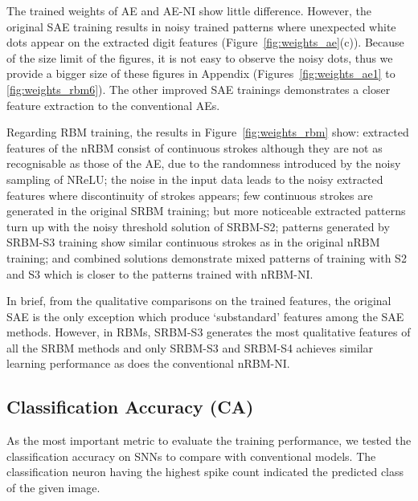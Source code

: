 The trained weights of AE and AE-NI show little difference.
However, the original SAE training results in noisy trained patterns where unexpected white dots appear on the extracted digit features (Figure~\ref{fig:weights_ae}(c)).
Because of the size limit of the figures, it is not easy to observe the noisy dots, thus we provide a bigger size of these figures in Appendix (Figures~\ref{fig:weights_ae1} to \ref{fig:weights_rbm6}).
The other improved SAE trainings demonstrates a closer feature extraction to the conventional AEs.



Regarding RBM training,
the results in Figure~\ref{fig:weights_rbm} show:
extracted features of the nRBM consist of continuous strokes although they are not as recognisable as those of the AE, due to the randomness introduced by the noisy sampling of NReLU;
the noise in the input data leads to the noisy extracted features where discontinuity of strokes appears;
few continuous strokes are generated in the original SRBM training;
but more noticeable extracted patterns turn up with the noisy threshold solution of SRBM-S2;
patterns generated by SRBM-S3 training show similar continuous strokes as in the original nRBM training;
and combined solutions demonstrate mixed patterns of training with S2 and S3 which is closer to the patterns trained with nRBM-NI. 

In brief, from the qualitative comparisons on the trained features, the original SAE is the only exception which produce `substandard' features among the SAE methods.
However, in RBMs, SRBM-S3 generates the most qualitative features of all the SRBM methods and only SRBM-S3 and SRBM-S4 achieves similar learning performance as does the conventional nRBM-NI.


\subsection{Classification Accuracy (CA)}
As the most important metric to evaluate the training performance, we tested the classification accuracy on SNNs to compare with conventional models.
The classification neuron having the highest spike count indicated the predicted class of the given image.

